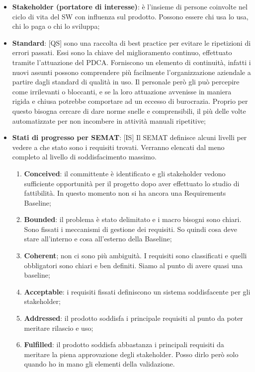 \begin{itemize}
	\item \textbf{Stakeholder (portatore di interesse)}: è l'insieme di persone coinvolte nel ciclo di vita del SW con influenza sul prodotto. \newline
	Possono essere chi usa lo usa, chi lo paga o chi lo sviluppa;
	\item \textbf{Standard}: [QS] sono una raccolta di best practice per evitare le ripetizioni di errori passati. Essi sono la chiave del miglioramento continuo, effettuato tramite l'attuazione del PDCA. \newline
	Forniscono un elemento di continuità, infatti i nuovi assunti possono comprendere più facilmente l'organizzazione aziendale a partire dagli standard di qualità in uso. \newline
	Il personale però gli può percepire come irrilevanti o bloccanti, e se la loro attuazione avvenisse in maniera rigida e chiusa potrebbe comportare ad un eccesso di burocrazia. Proprio per questo bisogna cercare di dare norme snelle e comprensibili, il più delle volte automatizzate per non incombere in attività manuali ripetitive;

	\item \textbf{Stati di progresso per SEMAT}: [IS] Il SEMAT definisce alcuni livelli per vedere a che stato sono i requisiti trovati. Verranno elencati dal meno completo al livello di soddisfacimento massimo.
		\begin{enumerate}
			\item \textbf{Conceived}: il committente è identificato e gli stakeholder vedono sufficiente opportunità per il progetto dopo aver effettuato lo studio di fattibilità. In questo momento non si ha ancora una Requirements Baseline;
			\item \textbf{Bounded}: il problema è stato delimitato e i macro bisogni sono chiari. Sono fissati i meccanismi di gestione dei requisiti. So quindi cosa deve stare all'interno e cosa all'esterno della Baseline;
			\item \textbf{Coherent}; non ci sono più ambiguità. I requisiti sono classificati e quelli obbligatori sono chiari e ben definiti. Siamo al punto di avere quasi una baseline;
			\item \textbf{Acceptable}: i requisiti fissati definiscono un sistema soddisfacente per gli stakeholder;
			\item \textbf{Addressed}: il prodotto soddisfa i principale requisiti al punto da poter meritare rilascio e uso;
			\item \textbf{Fulfilled}: il prodotto soddisfa abbastanza i principali requisiti da meritare la piena approvazione degli stakeholder. Posso dirlo però solo quando ho in mano gli elementi della validazione.
		\end{enumerate}


\end{itemize}
